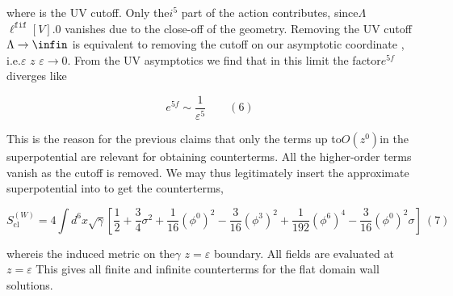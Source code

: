 \documentclass{article}
\begin{document}
where is the UV cutoff. Only the$i ^ { 5 }$ part of the action contributes, since$\Lambda$ $\ell ^ { \mathtt { f i f } } [ V ] . { 0 }$ vanishes
due to the close-off of the geometry. Removing the UV cutoff $\Lambda \rightarrow \infin$ is equivalent to
removing the cutoff  on our asymptotic coordinate , i.e.$\varepsilon$ $z$ $\varepsilon \rightarrow 0$. From the UV asymptotics
we find that in this limit the factor$e ^ { 5 f }$ diverges like


\begin{equation}
e ^ { 5 f } \sim \frac { 1 } { \varepsilon ^ { 5 } } \qquad ( 6 )
\end{equation}


This is the reason for the previous claims that only the terms up to$O ( z ^ { 0 } )$in the superpotential are relevant for obtaining counterterms. All the higher-order terms vanish as the cutoff
is removed. We may thus legitimately insert the approximate superpotential into to get the
counterterms,


\begin{equation}
S _ { \mathrm { c l } } ^ { ( W ) } = 4 \int d ^ { 6 } x \sqrt { \gamma } \left [ \frac { 1 } { 2 } + \frac { 3 } { 4 } \sigma ^ { 2 } + \frac { 1 } { 1 6 } ( \phi ^ { 0 } ) ^ { 2 } - \frac { 3 } { 1 6 } ( \phi ^ { 3 } ) ^ { 2 } + \frac { 1 } { 1 9 2 } ( \phi ^ { 6 } ) ^ { 4 } - \frac { 3 } { 1 6 } ( \phi ^ { 0 } ) ^ { 2 } \sigma \right ] ~ ( 7 )
\end{equation}


whereis the induced metric on the$\gamma$ $z = \varepsilon$ boundary. All fields are evaluated at$z = \varepsilon$ This
gives all finite and infinite counterterms for the flat domain wall solutions.
\end{document}
